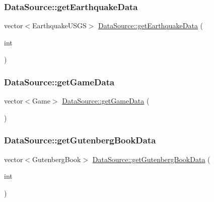 \subsubsection{\texorpdfstring{Data\+Source\+::get\+Earthquake\+Data}{DataSource::getEarthquakeData}}
{\footnotesize\ttfamily vector$<$Earthquake\+U\+S\+GS$>$ \mbox{\hyperlink{namespacebridges_1_1_data_source_a2af96553650d859b102f179b3db55389}{Data\+Source\+::get\+Earthquake\+Data}} (\begin{DoxyParamCaption}\item[{int}]{ }\end{DoxyParamCaption})\hspace{0.3cm}{\ttfamily [friend]}}

\mbox{\label{classbridges_1_1_server_comm_aaf9715981dcd976f93624bd3aa22183f}} 
\subsubsection{\texorpdfstring{Data\+Source\+::get\+Game\+Data}{DataSource::getGameData}}
{\footnotesize\ttfamily vector$<$Game$>$ \mbox{\hyperlink{namespacebridges_1_1_data_source_a96a28cc7f2a6013fe09b07cc53c7432f}{Data\+Source\+::get\+Game\+Data}} (\begin{DoxyParamCaption}{ }\end{DoxyParamCaption})\hspace{0.3cm}{\ttfamily [friend]}}

\mbox{\label{classbridges_1_1_server_comm_a8daad6bf2db8bf4f0b0f9914022b6aa4}} 
\subsubsection{\texorpdfstring{Data\+Source\+::get\+Gutenberg\+Book\+Data}{DataSource::getGutenbergBookData}}
{\footnotesize\ttfamily vector$<$Gutenberg\+Book$>$ \mbox{\hyperlink{namespacebridges_1_1_data_source_a8146b00565286727e8206e377d9ff5bd}{Data\+Source\+::get\+Gutenberg\+Book\+Data}} (\begin{DoxyParamCaption}\item[{int}]{ }\end{DoxyParamCaption})\hspace{0.3cm}{\ttfamily [friend]}}

